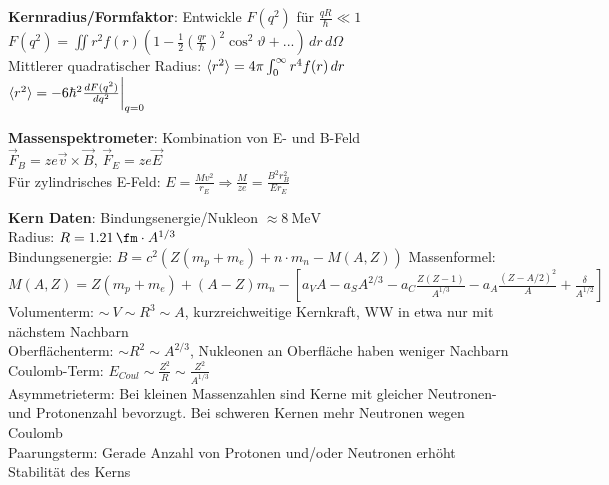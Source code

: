 \documentclass[10pt,twoside,a4paper]{article}
\begin{document}
\begin{multicols*}{3}
\textbf{Kernradius/Formfaktor}: Entwickle $F(q^2)$ für $\frac{qR}{\hbar} \ll 1$ \\
$F(q^2) = \iint r^2 f(r) \left( 1 - \frac{1}{2} \left( \frac{qr}{\hbar} \right)^2 \cos^2 \vartheta + ... \right) \,dr \,d\Omega$ \\
Mittlerer quadratischer Radius: $\braket{r^2} = 4\pi \int_0^{\infty} r^4 f(r) \,dr$ \\
$\braket{r^2} = -6\hbar^2 \frac{dF(q^2)}{dq^2}\bigg|_{q=0}$

\textbf{Massenspektrometer}: Kombination von E- und B-Feld \\
$\vec{F}_B = z e \vec{v} \times \vec{B}$, $\vec{F}_E = z e \vec{E}$ \\
Für zylindrisches E-Feld: $E = \frac{Mv^2}{r_E} \Rightarrow \frac{M}{z e} = \frac{B^2 r^2_B}{E r_E}$

\textbf{Kern Daten}: Bindungsenergie/Nukleon $\approx \SI{8}{\mega\eV}$ \\
Radius: $R = \SI{1.21}{\fm} \cdot A^{1/3}$ \\
Bindungsenergie: $B = c^2 \left( Z (m_p + m_e) + n \cdot m_n - M(A, Z) \right)$
Massenformel: $M\left( A, Z \right) = Z \left( m_p + m_e \right) + \left( A - Z \right) m_n - \left[ a_V A - a_S A^{2/3} - a_C \frac{Z(Z-1)}{A^{1/3}} - a_A \frac{(Z - A/2)^2}{A} + \frac{\delta}{A^{1/2}} \right]$ \\
Volumenterm: $\sim\ V \sim R^3 \sim A$, kurzreichweitige Kernkraft, WW in etwa nur mit nächstem Nachbarn \\
Oberflächenterm: $\sim R^2 \sim A^{2/3}$, Nukleonen an Oberfläche haben weniger Nachbarn \\
Coulomb-Term: $E_{Coul} \sim \frac{Z^2}{R} \sim \frac{Z^2}{A^{1/3}}$ \\
Asymmetrieterm: Bei kleinen Massenzahlen sind Kerne mit gleicher Neutronen- und Protonenzahl bevorzugt. Bei schweren Kernen mehr Neutronen wegen Coulomb \\
Paarungsterm: Gerade Anzahl von Protonen und/oder Neutronen erhöht Stabilität des Kerns \\


\end{multicols*}
\end{document}
